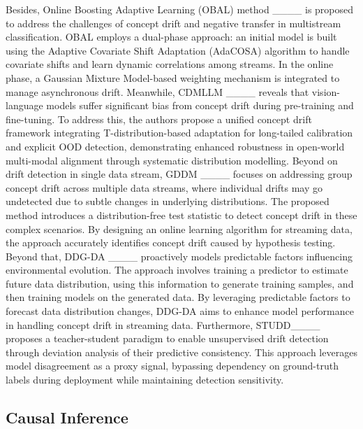 Besides, Online Boosting Adaptive Learning (OBAL) method ____ is proposed to address the challenges of concept drift and negative transfer in multistream classification. OBAL employs a dual-phase approach: an initial model is built using the Adaptive Covariate Shift Adaptation (AdaCOSA) algorithm to handle covariate shifts and learn dynamic correlations among streams. In the online phase, a Gaussian Mixture Model-based weighting mechanism is integrated to manage asynchronous drift. Meanwhile, CDMLLM ____ reveals that vision-language models suffer significant bias from concept drift during pre-training and fine-tuning. To address this, the authors propose a unified concept drift framework integrating T-distribution-based adaptation for long-tailed calibration and explicit OOD detection, demonstrating enhanced robustness in open-world multi-modal alignment through systematic distribution modelling. Beyond on drift detection in single data stream, GDDM ____ focuses on addressing group concept drift across multiple data streams, where individual drifts may go undetected due to subtle changes in underlying distributions. The proposed method introduces a distribution-free test statistic to detect concept drift in these complex scenarios. By designing an online learning algorithm for streaming data, the approach accurately identifies concept drift caused by hypothesis testing. Beyond that, DDG-DA ____ proactively models predictable factors influencing environmental evolution. The approach involves training a predictor to estimate future data distribution, using this information to generate training samples, and then training models on the generated data. By leveraging predictable factors to forecast data distribution changes, DDG-DA aims to enhance model performance in handling concept drift in streaming data. Furthermore, STUDD____ proposes a teacher-student paradigm to enable unsupervised drift detection through deviation analysis of their predictive consistency. This approach leverages model disagreement as a proxy signal, bypassing dependency on ground-truth labels during deployment while maintaining detection sensitivity.

\subsection{Causal Inference}

